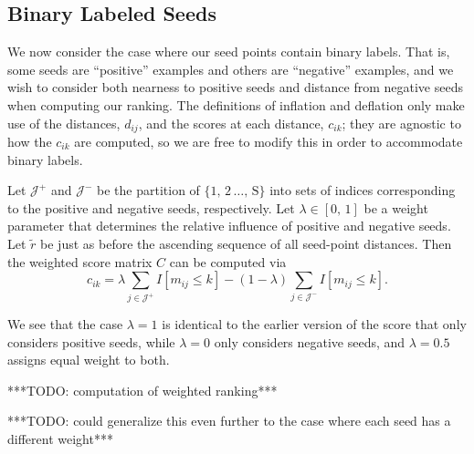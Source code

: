 \documentclass[11pt, oneside, fleqn, UTF8]{article} 	%
\theoremstyle{definition}
\newcommand{\tr}[0]{\tilde{r}}
\newcommand{\tm}[0]{\tilde{m}}
\newcommand{\rmS}[0]{\mathrm{S}}
\newcommand{\tj}[0]{\tilde{j}}
\begin{document}
\subsection{Binary Labeled Seeds}
We now consider the case where our seed points contain binary labels. That is, some seeds are ``positive'' examples and others are ``negative'' examples, and we wish to consider both nearness to positive seeds and distance from negative seeds when computing our ranking.  The definitions of inflation and deflation only make use of the distances, $d_{ij}$, and the scores at each distance, $c_{ik}$; they are agnostic to how the $c_{ik}$ are computed, so we are free to modify this in order to accommodate binary labels.

Let $\mathcal{J}^+$ and $\mathcal{J}^-$ be the partition of $\{1, \, 2\, \ldots, \, \rmS\}$ into sets of indices corresponding to the positive and negative seeds, respectively. Let $\lambda \in [0, \, 1]$ be a weight parameter that determines the relative influence of positive and negative seeds.  Let $\tr$ be just as before the ascending sequence of all seed-point distances.  Then the weighted score matrix $C$ can be computed via
$$ c_{ik} = \lambda \sum_{j \in \mathcal{J}^+} I[m_{ij} \leq k] - (1 - \lambda) \sum_{j \in \mathcal{J}^-} I[m_{ij} \leq k]. $$

We see that the case $\lambda = 1$ is identical to the earlier version of the score that only considers positive seeds, while $\lambda = 0$ only considers negative seeds, and $\lambda = 0.5$ assigns equal weight to both.

***TODO: computation of weighted ranking***

***TODO: could generalize this even further to the case where each seed has a different weight***

\end{document}
